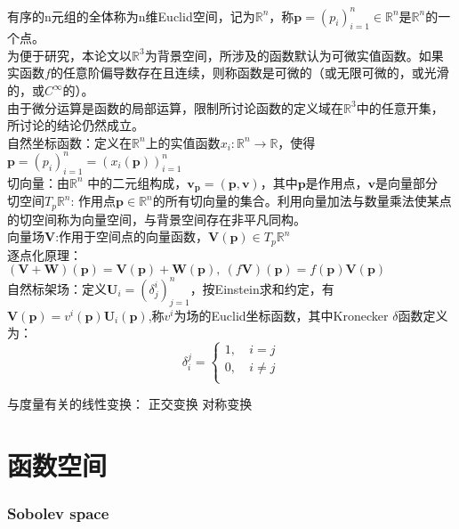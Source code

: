 \documentclass[UTF8]{../../09-Mathematics}
\begin{document}
有序的n元组的全体称为n维Euclid空间，记为$\mathbb R^n$，称$\boldsymbol p=(p_i)_{i=1}^n \in \mathbb R^n$是$\mathbb R^n$的一个点。\\
为便于研究，本论文以$ \mathbb R^3$为背景空间，所涉及的函数默认为可微实值函数。如果实函数$f$的任意阶偏导数存在且连续，则称函数是可微的（或无限可微的，或光滑的，或$C^\infty$的）。\\
由于微分运算是函数的局部运算，限制所讨论函数的定义域在$ \mathbb R^3$中的任意开集，所讨论的结论仍然成立。\\
自然坐标函数：定义在$\mathbb R^n$上的实值函数$x_i: \mathbb R^n \to  \mathbb R$，使得$\boldsymbol p=(p_i)_{i=1}^n = \left( x_i(\boldsymbol p) \right)_{i=1}^n   $\\
切向量：由$\mathbb R^n$ 中的二元组构成，$\boldsymbol v_{\boldsymbol p}=(\boldsymbol p,\boldsymbol v)$，其中$\boldsymbol p$是作用点，$\boldsymbol v$是向量部分\\
切空间$T_p  \mathbb R^n$: 作用点$\boldsymbol p \in \mathbb R^n$的所有切向量的集合。利用向量加法与数量乘法使某点的切空间称为向量空间，与背景空间存在非平凡同构。\\
向量场$\boldsymbol V$:作用于空间点的向量函数，$\boldsymbol V(\boldsymbol p)\in T_p  \mathbb R^n $\\
逐点化原理：$(\boldsymbol V+\boldsymbol W)(\boldsymbol p)=\boldsymbol V(\boldsymbol p)+\boldsymbol W(\boldsymbol p),\ (f \boldsymbol V)(\boldsymbol p)= f(\boldsymbol p)\boldsymbol V (\boldsymbol p)$\\
自然标架场：定义$\boldsymbol U_i=(\delta _j^i)_{j=1}^n$，按Einstein求和约定，有$\boldsymbol V(\boldsymbol p)=v^i(\boldsymbol p)\boldsymbol U_i(\boldsymbol p)$,称$v^i$为场的Euclid坐标函数，其中Kronecker $\delta$函数定义为：
\begin{equation}
\label{Kronecker_delta}
\delta _i^j=\left\{ 
    \begin{aligned}
    1,\  & i =j\\
    0,\  & i \neq j\\
    \end{aligned}
     \right.
\end{equation}


与度量有关的线性变换：
正交变换
对称变换






\chapter{函数空间}

\subsection{Sobolev space}
\end{document}
